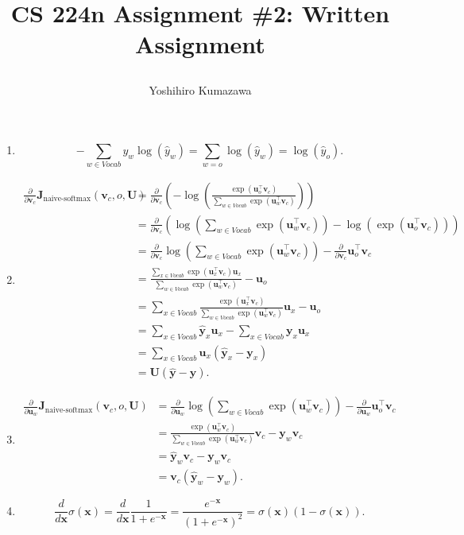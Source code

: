 \documentclass[12pt]{article}
\title{
  \vspace{-2cm}
  CS 224n Assignment \#2: Written Assignment \\
  \author{Yoshihiro Kumazawa}
}
\begin{document}
\maketitle
\begin{enumerate}[label=(\alph*)]
\item \[-\sum_{w\in Vocab}y_w\log(\hat{y}_w)=\sum_{w=o}\log(\hat{y}_w)=\log(\hat{y}_o).\]
\item \begin{align*}
\frac{\partial}{\partial\bm{v}_c}\bm{J}_{\textrm{naive-softmax}}(\bm{v}_c,o,\bm{U}) &=\frac{\partial}{\partial\bm{v}_c}\left(-\log\left(\frac{\exp(\bm{u}_o^\top\bm{v}_c)}{\sum_{w\in Vocab}\exp(\bm{u}_w^\top\bm{v}_c)}\right)\right) \\
&=\frac{\partial}{\partial\bm{v}_c}\left(\log\left(\sum_{w\in Vocab}\exp(\bm{u}_w^\top\bm{v}_c)\right)-\log\left(\exp(\bm{u}_o^\top\bm{v}_c)\right)\right) \\
&=\frac{\partial}{\partial\bm{v}_c}\log\left(\sum_{w\in Vocab}\exp(\bm{u}_w^\top\bm{v}_c)\right)-\frac{\partial}{\partial\bm{v}_c}\bm{u}_o^\top\bm{v}_c \\
&=\frac{\sum_{x\in Vocab}\exp(\bm{u}_x^\top\bm{v}_c)\bm{u}_x}{\sum_{w\in Vocab}\exp(\bm{u}_w^\top\bm{v}_c)}-\bm{u}_o \\
&=\sum_{x\in Vocab}\frac{\exp(\bm{u}_x^\top\bm{v}_c)}{\sum_{w\in Vocab}\exp(\bm{u}_w^\top\bm{v}_c)}\bm{u}_x-\bm{u}_o \\
&=\sum_{x\in Vocab}\bm{\hat{y}}_x\bm{u}_x-\sum_{x\in Vocab}\bm{y}_x\bm{u}_x \\
&=\sum_{x\in Vocab}\bm{u}_x(\bm{\hat{y}}_x-\bm{y}_x) \\
&=\bm{U}(\bm{\hat{y}}-\bm{y}).
\end{align*}
\item \begin{align*} \frac{\partial}{\partial\bm{u}_w}\bm{J}_{\textrm{naive-softmax}}(\bm{v}_c,o,\bm{U}) &=\frac{\partial}{\partial\bm{u}_w}\log\left(\sum_{w\in Vocab}\exp(\bm{u}_w^\top\bm{v}_c)\right)-\frac{\partial}{\partial\bm{u}_w}\bm{u}_o^\top\bm{v}_c \\
&=\frac{\exp(\bm{u}_w^\top\bm{v}_c)}{\sum_{w\in Vocab}\exp(\bm{u}_w^\top\bm{v}_c)}\bm{v}_c-\bm{y}_w\bm{v}_c \\
&=\bm{\hat{y}}_w\bm{v}_c-\bm{y}_w\bm{v}_c \\
&=\bm{v}_c(\bm{\hat{y}}_w-\bm{y}_w).
\end{align*}
\item \[\frac{d}{d\bm{x}}\sigma(\bm{x})=\frac{d}{d\bm{x}}\frac{1}{1+e^{-\bm{x}}}=\frac{e^{-\bm{x}}}{(1+e^{-\bm{x}})^2}=\sigma(\bm{x})(1-\sigma(\bm{x})).\]

\end{enumerate}
\end{document}
